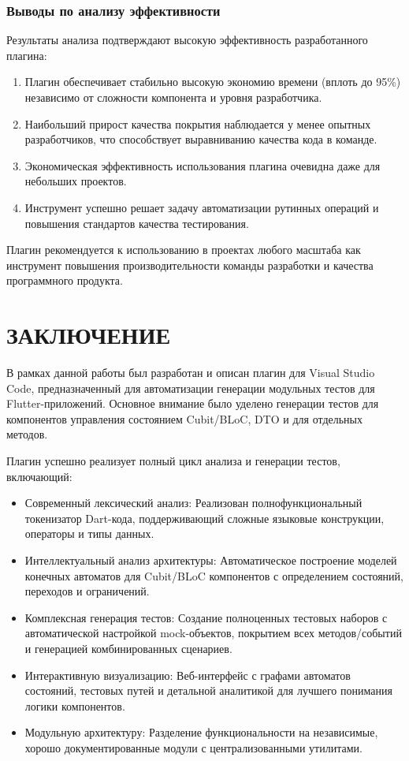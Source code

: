 \documentclass[14pt, russian]{scrartcl}
\newcommand{\anonsection}[1]{\cleardoublepage
\phantomsection
\addcontentsline{toc}{section}{\protect\numberline{}#1}
\section*{#1}\vspace*{2.5ex} %
}
\begin{document}
\subsubsection{Выводы по анализу эффективности}

Результаты анализа подтверждают высокую эффективность разработанного плагина:

\begin{enumerate}
    \item Плагин обеспечивает стабильно высокую экономию времени (вплоть до 95\%) независимо от сложности компонента и уровня разработчика.
    \item Наибольший прирост качества покрытия наблюдается у менее опытных разработчиков, что способствует выравниванию качества кода в команде.
    \item Экономическая эффективность использования плагина очевидна даже для небольших проектов.
    \item Инструмент успешно решает задачу автоматизации рутинных операций и повышения стандартов качества тестирования.
\end{enumerate}

Плагин рекомендуется к использованию в проектах любого масштаба как инструмент повышения производительности команды разработки и качества программного продукта.

\anonsection{ЗАКЛЮЧЕНИЕ}
В рамках данной работы был разработан и описан плагин для Visual Studio Code, предназначенный для автоматизации генерации модульных тестов для Flutter-приложений. Основное внимание было уделено генерации тестов для компонентов управления состоянием Cubit/BLoC, DTO и для отдельных методов.

Плагин успешно реализует полный цикл анализа и генерации тестов, включающий:
\begin{itemize}
    \item Современный лексический анализ: Реализован полнофункциональный токенизатор Dart-кода, поддерживающий сложные языковые конструкции, операторы и типы данных.
    \item Интеллектуальный анализ архитектуры: Автоматическое построение моделей конечных автоматов для Cubit/BLoC компонентов с определением состояний, переходов и ограничений.
    \item Комплексная генерация тестов: Создание полноценных тестовых наборов с автоматической настройкой mock-объектов, покрытием всех методов/событий и генерацией комбинированных сценариев.
    \item Интерактивную визуализацию: Веб-интерфейс с графами автоматов состояний, тестовых путей и детальной аналитикой для лучшего понимания логики компонентов.
    \item Модульную архитектуру: Разделение функциональности на независимые, хорошо документированные модули с централизованными утилитами.
\end{itemize}
\end{document}
